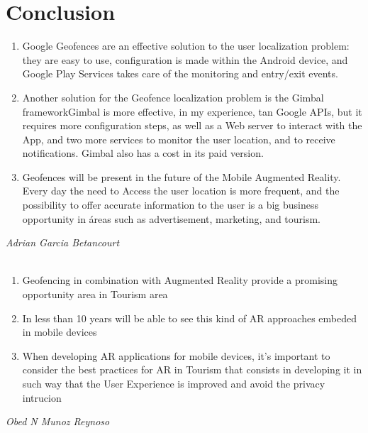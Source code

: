 \section{Conclusion}

\begin{enumerate}
\item Google Geofences are an effective solution to the user localization problem: they are easy to use, configuration is made within the Android device, and Google Play Services takes care of the monitoring and entry/exit events.

\item Another solution for the Geofence localization problem is the Gimbal frameworkGimbal is more effective,  in my experience, tan Google APIs, but it requires more configuration steps, as well as a Web server to interact with the App, and two more services to monitor the user location, and to receive notifications. Gimbal also has a cost in its paid version.

\item Geofences will be present in the future of the Mobile Augmented Reality. Every day the need to Access the user location is more frequent, and the possibility to offer accurate information to the user is a big business opportunity in áreas such as advertisement, marketing, and tourism.
\end{enumerate}

\textit{Adrian Garcia Betancourt} \\\\

\begin{enumerate}
  \item Geofencing in combination with Augmented Reality provide a promising 
        opportunity area in Tourism area 
  \item In less than 10 years will be able to see this kind of AR approaches
        embeded in mobile devices
  \item When developing AR applications for mobile devices, it's important
        to consider the best practices for AR in Tourism that consists in 
        developing it in such way that the User Experience is improved and 
        avoid the privacy intrucion
\end{enumerate}

\textit{Obed N Munoz Reynoso}
